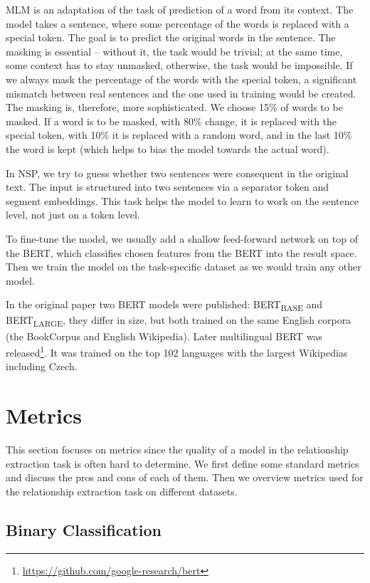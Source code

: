 MLM is an adaptation of the task of prediction of a word from its context. The model takes a sentence, where some percentage of the words is replaced with a special token. The goal is to predict the original words in the sentence. The masking is essential -- without it, the task would be trivial; at the same time, some context has to stay unmasked, otherwise, the task would be impossible. If we always mask the percentage of the words with the special token, a significant mismatch between real sentences and the one used in training would be created. The masking is, therefore, more sophisticated. We choose 15\% of words to be masked. If a word is to be masked, with 80\% change, it is replaced with the special token, with 10\% it is replaced with a random word, and in the last 10\% the word is kept (which helps to bias the model towards the actual word).

In NSP, we try to guess whether two sentences were consequent in the original text. The input is structured into two sentences via a separator token and segment embeddings. This task helps the model to learn to work on the sentence level, not just on a token level.

To fine-tune the model, we usually add a shallow feed-forward network on top of the BERT, which classifies chosen features from the BERT into the result space. Then we train the model on the task-specific dataset as we would train any other model.

In the original paper \citep{bert} two BERT models were published: BERT\textsubscript{BASE} and BERT\textsubscript{LARGE}, they differ in size, but both trained on the same English corpora (the BookCorpus and English Wikipedia). Later multilingual BERT was released\footnote{\url{https://github.com/google-research/bert}}. It was trained on the top 102 languages with the largest Wikipedias including Czech.


\section{Metrics}
This section focuses on metrics since the quality of a model in the relationship extraction task is often hard to determine. We first define some standard metrics and discuss the pros and cons of each of them. Then we overview metrics used for the relationship extraction task on different datasets.

\subsection{Binary Classification}

